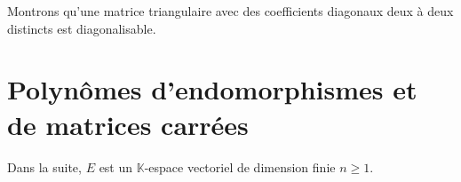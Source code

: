 \documentclass[french,11pt,twoside]{VcCours}
\begin{document}
\begin{Exemple}{} Montrons qu'une matrice triangulaire avec des coefficients diagonaux deux à deux distincts est diagonalisable.

\vspace{4cm}
\end{Exemple}
%
%
%
%
%
%
%

%
%


\section{Polynômes d'endomorphismes et de matrices carrées}
Dans la suite, $E$ est un $\mathbb{K}$-espace vectoriel de dimension finie $n \geq 1$.
\end{document}

